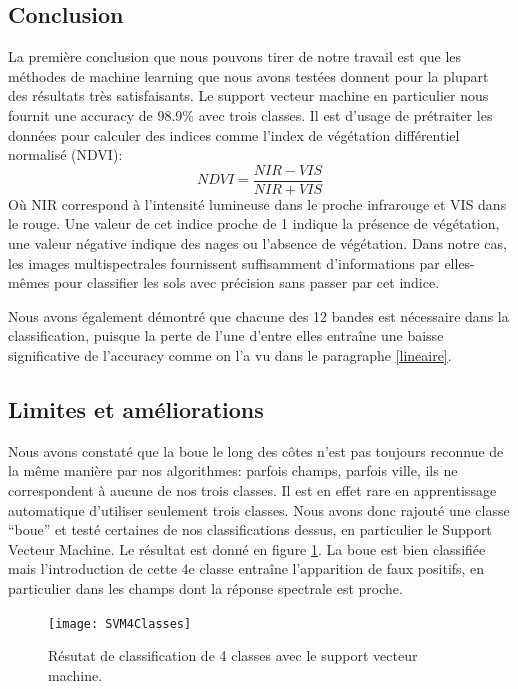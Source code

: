 \documentclass[a4paper,10pt]{article}
\begin{document}
\subsection{Conclusion}
La première conclusion que nous pouvons tirer de notre travail est que les méthodes de machine learning que nous avons testées donnent pour la plupart des résultats très satisfaisants. Le support vecteur machine en particulier nous fournit une accuracy de 98.9\% avec trois classes. Il est d'usage de prétraiter les données pour calculer des indices comme l'index de végétation différentiel normalisé (NDVI)\cite{NDVI}:
\begin{equation}
NDVI=\frac{NIR-VIS}{NIR+VIS}
\end{equation}
Où NIR correspond à l'intensité lumineuse dans le proche infrarouge et VIS dans le rouge. Une valeur de cet indice proche de 1 indique la présence de végétation, une valeur négative indique des nages ou l'absence de végétation. Dans notre cas, les images multispectrales fournissent suffisamment d'informations par elles-mêmes pour classifier les sols avec précision sans passer par cet indice.

Nous avons également démontré que chacune des 12 bandes est nécessaire dans la classification, puisque la perte de l'une d'entre elles entraîne une baisse significative de l'accuracy comme on l'a vu dans le paragraphe \ref{lineaire}.

\subsection{Limites et améliorations}
Nous avons constaté que la boue le long des côtes n'est pas toujours reconnue de la même manière par nos algorithmes: parfois champs, parfois ville, ils ne correspondent à aucune de nos trois classes. Il est en effet rare en apprentissage automatique d'utiliser seulement trois classes. Nous avons donc rajouté une classe ``boue'' et testé certaines de nos classifications dessus, en particulier le Support Vecteur Machine. Le résultat est donné en figure \ref{fig:SVM4Cl}. La boue est bien classifiée mais l'introduction de cette 4e classe entraîne l'apparition de faux positifs, en particulier dans les champs dont la réponse spectrale est proche.
\begin{figure}
  \centering
    \texttt{[image: SVM4Classes]}
  \caption{Résutat de classification de 4 classes avec le support vecteur machine.}
  \label{fig:SVM4Cl}
\end{figure}
\end{document}
